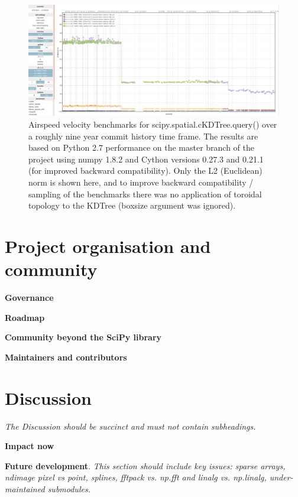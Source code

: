 \documentclass[fleqn,10pt]{wlscirep}
\begin{document}
    \begin{figure}[!ht]
        \centering
        \includegraphics[width=\textwidth]{static/asv_time_query_ckdtree}
        \caption{Airspeed velocity benchmarks for scipy.spatial.cKDTree.query() over a roughly nine year commit history time frame. The results are based on Python 2.7 performance on the master branch of the project using numpy 1.8.2 and Cython versions 0.27.3 and 0.21.1 (for improved backward compatibility). Only the L2 (Euclidean) norm is shown here, and to improve backward compatibility / sampling of the benchmarks there was no application of toroidal topology to the KDTree (boxsize argument was ignored).}
    \end{figure}



\section*{Project organisation and community}

\textbf{Governance}

\textbf{Roadmap}

\textbf{Community beyond the SciPy library}

\textbf{Maintainers and contributors}


\section*{Discussion}

\textit{The Discussion should be succinct and must not contain subheadings.}

\textbf{Impact now}

\textbf{Future development}.
\textit{This section should include key issues: sparse arrays, ndimage pixel vs point, splines, fftpack vs. np.fft and linalg vs. np.linalg, under-maintained submodules.}



\end{document}
